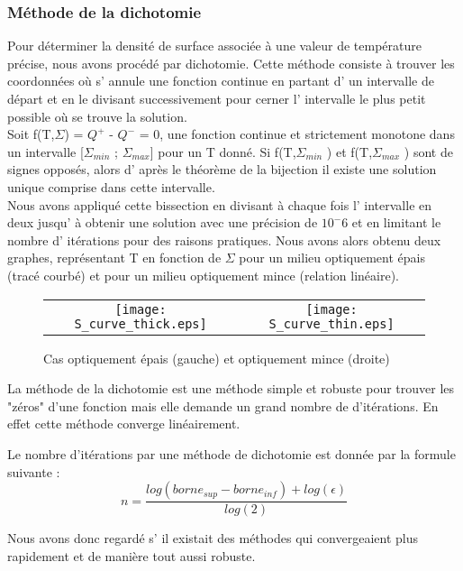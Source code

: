 \subsubsection{Méthode de la dichotomie}

Pour déterminer la densité de surface associée à une valeur de température précise, nous avons procédé par dichotomie.
Cette méthode consiste à trouver les coordonnées où s' annule une fonction continue en partant d' un intervalle de départ et en le divisant successivement pour cerner l' intervalle le plus petit possible où se trouve la solution.  
\\
Soit f(T,$\Sigma$) = $Q^+$ - $Q^-$ = 0,  une fonction continue et strictement monotone dans un intervalle [$\Sigma_{min}$ ; $\Sigma_{max}$] pour un T donné. Si f(T,$\Sigma_{min}$ ) et  f(T,$\Sigma_{max}$ ) sont de signes opposés, alors d' après le théorème de la bijection il existe une solution unique comprise dans cette intervalle. 
\\
Nous avons appliqué cette bissection en divisant à chaque fois l' intervalle en deux jusqu' à obtenir une solution avec une précision de $10^-6$ et en limitant le nombre d' itérations pour des raisons pratiques. Nous avons alors obtenu deux graphes, représentant T en fonction de $\Sigma$ pour un milieu optiquement épais (tracé courbé) et pour un milieu optiquement mince (relation linéaire).
\\

\begin{figure}[htb!]
\centering
\begin{tabular}{cc} 
\texttt{[image: S\_curve\_thick.eps]} &
\texttt{[image: S\_curve\_thin.eps]} \\
\end{tabular}
  \caption{Cas optiquement épais (gauche) et optiquement mince (droite)}
\label{Fig::}
\end{figure}

La méthode de la dichotomie est une méthode simple et robuste pour trouver les "zéros" d'une fonction mais elle demande un grand nombre de d'itérations. En effet cette méthode converge linéairement.

Le nombre d'itérations par une méthode de dichotomie est donnée par la formule suivante : 
\begin{equation}
n = \frac{log(borne_{sup} - borne_{inf}) + log(\epsilon)}{log(2)} 
\end{equation}

Nous avons donc regardé s' il existait des méthodes qui convergeaient plus rapidement et de manière tout aussi robuste. 

